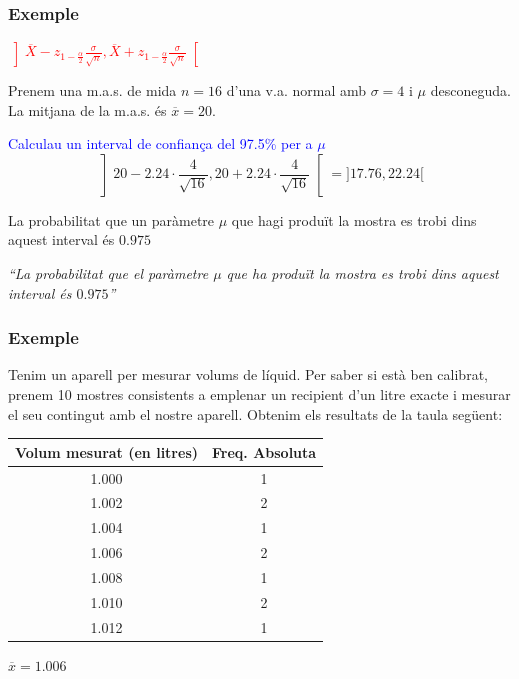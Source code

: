 \documentclass[12pt,t]{beamer}
\newcommand{\red}[1]{\textcolor{red}{#1}}
\newcommand{\blue}[1]{\textcolor{blue}{#1}}
\theoremstyle{plain}
\theoremstyle{definition}
\begin{document}
\begin{frame}
\frametitle{Exemple}
\red{$\displaystyle
\left]\overline{X} -z_{1-\frac{\alpha}{2}} \frac{\sigma}{\sqrt{n}}, \overline{X}+z_{1-\frac{\alpha}{2}}\frac{\sigma}{\sqrt{n}}
\right[$}
\medskip


Prenem una m.a.s. de mida $n=16$ d'una v.a. normal amb $\sigma=4$ i $\mu$ desconeguda. La mitjana de la m.a.s. és 
$\overline{x}=20$.
\medskip

\blue{Calculau un interval de confiança del 97.5\% per a $\mu$}
\pause
$$
\left] 20-2.24\cdot \frac{4}{\sqrt{16}} ,
20+2.24\cdot \frac{4}{\sqrt{16}}
\right[
=]17.76,22.24[
$$

La probabilitat que un paràmetre $\mu$ que hagi produït la mostra es trobi dins aquest interval  és $0.975$
\pause\medskip

\textsl{``La probabilitat que el paràmetre $\mu$ que ha produït la mostra es trobi dins aquest interval  és $0.975$''}


\end{frame}



\begin{frame}
\frametitle{Exemple}
Tenim un aparell per mesurar volums de líquid. Per saber si està ben
calibrat, prenem 10 mostres consistents a emplenar un recipient d'un litre exacte i mesurar el seu contingut amb el nostre aparell. Obtenim els resultats de la taula següent:
\begin{center}
\begin{tabular}{c|c}
\hline
Volum mesurat  (en litres) & Freq. Absoluta\\
\hline
1.000 & 1 \\
1.002 & 2 \\
1.004 & 1 \\
1.006 & 2 \\
1.008 & 1 \\
1.010 & 2 \\
1.012 & 1 \\
\end{tabular}
\medskip

$\overline{x}=1.006$
\end{center}

\end{frame}
\end{document}
